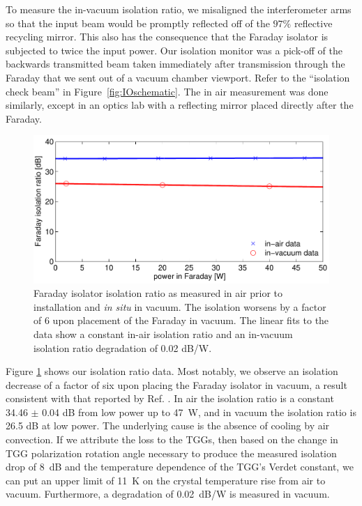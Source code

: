 To measure the in-vacuum isolation ratio, we misaligned the
interferometer arms so that the input beam would be 
promptly reflected off of the $97\%$ reflective recycling mirror. This
also has the consequence that 
the Faraday isolator is subjected to twice the input
power. Our isolation monitor was a pick-off of the backwards 
transmitted beam taken immediately after transmission
through the Faraday that we sent out of a vacuum chamber
viewport. Refer to the ``isolation check beam'' in 
Figure~\ref{fig:IOschematic}. The in air measurement was done similarly,
except in an optics lab with a reflecting mirror placed directly after
the Faraday. 

\begin{figure}
\begin{centering}
\includegraphics[width=1.0\columnwidth]{figures/FaradayIR.pdf}
\caption[Faraday isolator isolation ratio as measured in air and in
vacuum]{Faraday isolator isolation ratio as measured in air prior to
  installation and \emph{in situ} in vacuum. The isolation worsens by
  a factor of 6 upon placement of the Faraday in vacuum. The linear
  fits to the data show a constant in-air isolation ratio and an
  in-vacuum isolation ratio degradation of 0.02 dB/W.}
\label{fig:IR}
\end{centering}
\end{figure}

Figure \ref{fig:IR} shows our isolation ratio data. Most notably, we
observe an isolation decrease of a factor of six upon placing the
Faraday isolator in vacuum, a result consistent with that reported by
Ref. \citep{TheVIRGOCollaboration2008Invacuum}. In air the isolation
ratio is a constant 34.46 $\pm$ 0.04 dB from low power up to 47~W, and
in vacuum the isolation ratio is 26.5 dB at low power. The underlying
cause is the absence of cooling by air convection. If we attribute the
loss to the TGGs, then based on the change in TGG polarization
rotation angle necessary to produce the measured isolation drop of
8~dB and the temperature dependence of the TGG's Verdet constant, we
can put an upper limit of 11~K on the crystal temperature rise from
air to vacuum. Furthermore, a degradation of 0.02~dB/W is measured in
vacuum.

